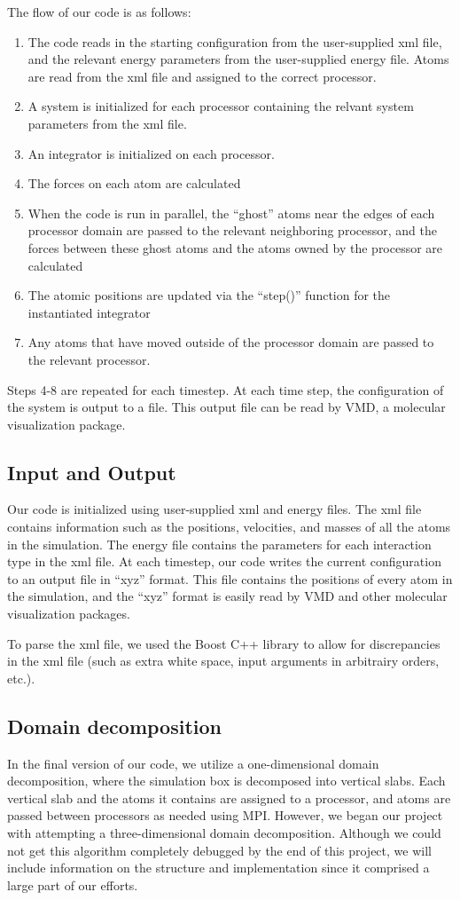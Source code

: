 \documentclass[10pt]{article}
\begin{document}
The flow of our code is as follows:
\begin{enumerate}
\item The code reads in the starting configuration from the user-supplied xml file, and the relevant energy parameters from the user-supplied energy file. Atoms are read from the xml file and assigned to the correct processor. 
\item A system is initialized for each processor containing the relvant system parameters from the xml file.
\item An integrator is initialized on each processor. 
\item The forces on each atom are calculated
\item When the code is run in parallel, the ``ghost'' atoms near the edges of each processor domain are passed to the relevant neighboring processor, and the forces between these ghost atoms and the atoms owned by the processor are calculated
\item The atomic positions are updated via the ``step()'' function for the instantiated integrator
\item Any atoms that have moved outside of the processor domain are passed to the relevant processor.
\end{enumerate}
Steps 4-8 are repeated for each timestep. 
%
At each time step, the configuration of the system is output to a file.
%
This output file can be read by VMD, a molecular visualization package.

\subsection{Input and Output}
Our code is initialized using user-supplied xml and energy files.
%
The xml file contains information such as the positions, velocities, and masses of all the atoms in the simulation.
%
%
The energy file contains the parameters for each interaction type in the xml file.
%
At each timestep, our code writes the current configuration to an output file in ``xyz'' format. 
%
This file contains the positions of every atom in the simulation, and the ``xyz'' format is easily read by VMD and other molecular visualization packages.

To parse the xml file, we used the Boost C++ library to allow for discrepancies in the xml file (such as extra white space, input arguments in arbitrairy orders, etc.).

\subsection{Domain decomposition}
In the final version of our code, we utilize a one-dimensional domain decomposition, where the simulation box is decomposed into vertical slabs.
%
Each vertical slab and the atoms it contains are assigned to a processor, and atoms are passed between processors as needed using MPI. 
%
However, we began our project with attempting a three-dimensional domain decomposition.
%
Although we could not get this algorithm completely debugged by the end of this project, we will include information on the structure and implementation since it comprised a large part of our efforts.
\end{document}
